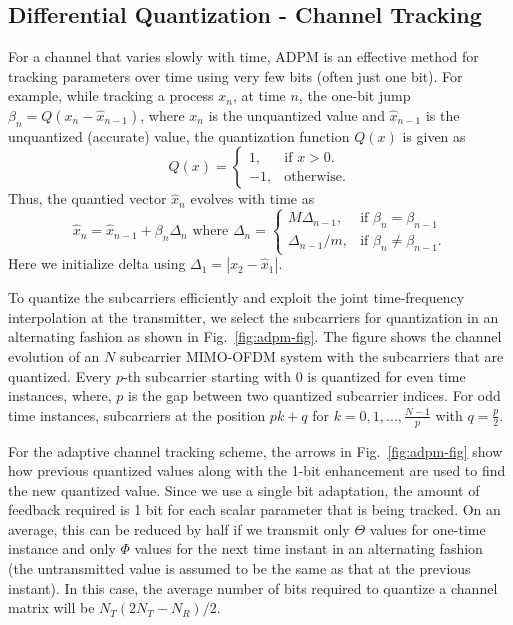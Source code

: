 \documentclass[conference]{IEEEtran}
\begin{document}
\subsection{Differential Quantization - Channel Tracking}
\label{quantiz}
For a channel that varies slowly with time, ADPM is an effective
method for tracking parameters over time using very few bits (often
just one bit). For example, while tracking a process $x_n$, at time
$n$, the one-bit jump $\beta_{n} = Q(x_{n} - \hat{x}_{n-1})$, where
$x_n$ is the unquantized value and $\hat{x}_{n-1}$ is the unquantized
(accurate) value, the quantization function $Q(x)$ is given as
\begin{equation}
  Q(x)=\begin{cases}
    1, & \text{if $x>0$}.\\
    -1, & \text{otherwise}.
  \end{cases}
\end{equation}
Thus, the quantied vector $\hat{x}_n$ evolves with time as
\begin{equation}
\hat{x}_{n} = \hat{x}_{n-1} + \beta_{n}\Delta_{n} \mbox{ where }
\label{delta_eqn}
\Delta_{n} = \begin{cases}
    M \Delta_{n-1}, & \text{if $\beta_{n} = \beta_{n-1}$}\\
    \Delta_{n-1}/m , & \text{if $\beta_{n} \neq \beta_{n-1}$}.
  \end{cases}
\end{equation}
Here we initialize delta using $\Delta_1 = |x_{2}-\hat{x}_1|$.

To quantize the subcarriers efficiently and exploit the joint
time-frequency interpolation at the transmitter, we select the
subcarriers for quantization in an alternating fashion as shown in
Fig.~\ref{fig:adpm-fig}. The figure shows the channel evolution of an
$N$ subcarrier MIMO-OFDM system with the subcarriers that are
quantized. Every $p$-th subcarrier starting with $0$ is quantized for
even time instances, where, $p$ is the gap between two quantized
subcarrier indices. For odd time instances, subcarriers at the
position $pk+q$ for $k = 0,1,..., \frac{N-1}{p}$ with $q =
{\frac{p}{2}}$.

For the adaptive channel tracking scheme, the arrows in
Fig.~\ref{fig:adpm-fig} show how previous quantized values along with
the 1-bit enhancement are used to find the new quantized value. Since
we use a single bit adaptation, the amount of feedback required is 1
bit for each scalar parameter that is being tracked. On an average,
this can be reduced by half if we transmit only $\Theta$ values for
one-time instance and only $\Phi$ values for the next time instant in
an alternating fashion (the untransmitted value is assumed to be the
same as that at the previous instant). In this case, the average
number of bits required to quantize a channel matrix will be
$N_{T}(2N_{T} - N_{R})/2$.
\end{document}
